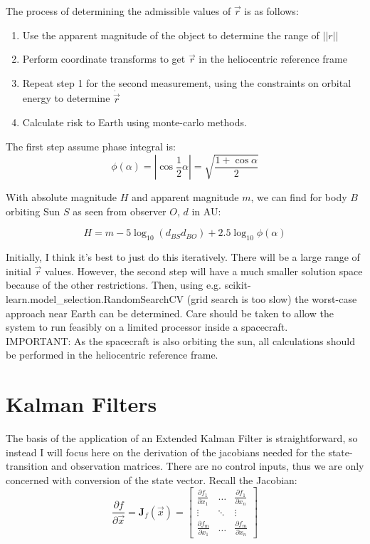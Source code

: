 \documentclass[a4paper,10pt]{article}
\begin{document}
The process of determining the admissible values of $\vec{r}$ is as follows:
\begin{enumerate}
 \item Use the apparent magnitude of the object to determine the range of $||r||$
 \item Perform coordinate transforms to get $\vec{r}$ in the heliocentric reference frame
 \item Repeat step 1 for the second measurement, using the constraints on orbital energy to determine $\dot{\vec{r}}$
 \item Calculate risk to Earth using monte-carlo methods.
\end{enumerate}

The first step assume phase integral is:
\begin{equation}
 \phi(\alpha) = |\cos{\frac{1}{2}\alpha}| = \sqrt{\frac{1+\cos \alpha}{2}}
 \label{eq:phase}
\end{equation}


With absolute magnitude $H$ and apparent magnitude $m$, we can find for body $B$ orbiting Sun $S$ as seen from observer $O$, $d$ in AU:

\begin{equation}
 H = m - 5 \log _{10} \left(d_{BS}d_{BO}\right) + 2.5\log _{10} \phi(\alpha)
\end{equation}

Initially, I think it's best to just do this iteratively. There will be a large range of initial $\vec{r}$ values. However, the second step will have a much smaller solution space because of the other restrictions. Then, using e.g. scikit-learn.model\_selection.RandomSearchCV (grid search is too slow) the worst-case approach near Earth can be determined. Care should be taken to allow the system to run feasibly on a limited processor inside a spacecraft.\\

IMPORTANT: As the spacecraft is also orbiting the sun, all calculations should be performed in the heliocentric reference frame.

\section{Kalman Filters}

The basis of the application of an Extended Kalman Filter is straightforward, so instead I will focus here on the derivation of the jacobians needed for the state-transition and observation matrices. There are no control inputs, thus we are only concerned with conversion of the state vector. Recall the Jacobian:
\begin{equation}
 \frac{\partial f}{\partial \vec{x}} = \mathbf{J}_f(\vec{x}) =
 \begin{bmatrix}
  \frac{\partial f_1}{\partial x_1} & \hdots & \frac{\partial f_1}{\partial x_n} \\
  \vdots & \ddots & \vdots \\
  \frac{\partial f_m}{\partial x_1} & \hdots & \frac{\partial f_m}{\partial x_n}
 \end{bmatrix}
\end{equation}
\end{document}
